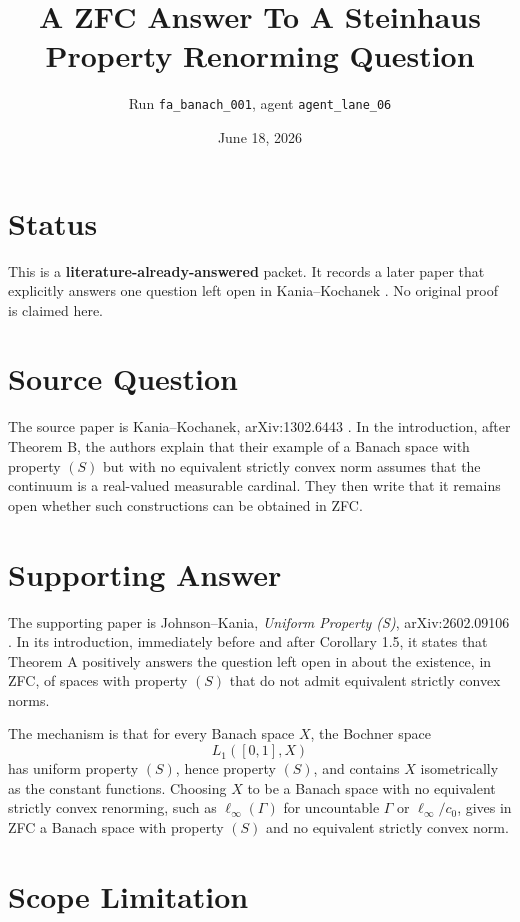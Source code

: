 \documentclass[11pt]{article}
\title{A ZFC Answer To A Steinhaus Property Renorming Question}
\author{Run \texttt{fa\_banach\_001}, agent \texttt{agent\_lane\_06}}
\date{June 18, 2026}
\begin{document}
\maketitle

\section*{Status}

This is a \textbf{literature-already-answered} packet.  It records a later
paper that explicitly answers one question left open in Kania--Kochanek
\cite{KK}.  No original proof is claimed here.

\section*{Source Question}

The source paper is Kania--Kochanek, arXiv:1302.6443 \cite{KK}.
In the introduction, after Theorem B, the authors explain that their example of a Banach space with
property \((S)\) but with no equivalent strictly convex norm assumes that the
continuum is a real-valued measurable cardinal.  They then write that it
remains open whether such constructions can be obtained in ZFC.

\section*{Supporting Answer}

The supporting paper is Johnson--Kania, \emph{Uniform Property (S)},
arXiv:2602.09106 \cite{JK}.  In its introduction, immediately before and
after Corollary 1.5, it states that Theorem A positively answers the question
left open in \cite{KK} about the existence, in ZFC, of spaces with property
\((S)\) that do not admit equivalent strictly convex norms.

The mechanism is that for every Banach space \(X\), the Bochner space
\[
  L_1([0,1],X)
\]
has uniform property \((S)\), hence property \((S)\), and contains \(X\)
isometrically as the constant functions.  Choosing \(X\) to be a Banach space
with no equivalent strictly convex renorming, such as \(\ell_\infty(\Gamma)\)
for uncountable \(\Gamma\) or \(\ell_\infty/c_0\), gives in ZFC a Banach
space with property \((S)\) and no equivalent strictly convex norm.

\section*{Scope Limitation}
\end{document}
